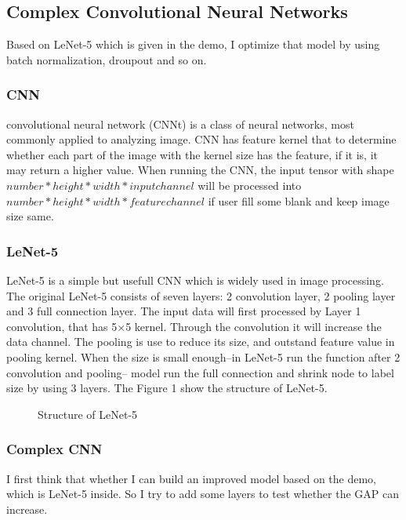 \documentclass{article}
\begin{document}
\subsection{Complex Convolutional Neural Networks}
Based on LeNet-5 which is given in the demo, I optimize that model by using batch normalization, droupout and so on. 
\subsubsection{CNN}
convolutional neural network (CNNt) is a class of neural networks, most commonly applied to analyzing image. CNN has feature kernel that to determine whether each part of the image with the kernel size has the feature, if it is, it may return a higher value. When running the CNN, the input tensor with shape $number*height*width*input channel$ will be processed into $number*height*width*feature channel$ if user fill some blank and keep image size same.

\subsubsection{LeNet-5}
LeNet-5 is a simple but usefull CNN which is widely used in image processing. The original LeNet-5 consists of seven layers: 2 convolution layer, 2 pooling layer and 3 full connection layer. The input data will first processed by Layer 1 convolution, that has 5$\times$5 kernel. Through the convolution it will increase the data channel. The pooling is use to reduce its size, and outstand feature value in pooling kernel. When the size is small enough--in LeNet-5 run the function after 2 convolution and pooling-- model run the full connection and shrink node to label size by using 3 layers. The Figure 1 show the structure of LeNet-5.
\begin{figure}[h]
  \centering
  \caption{Structure of LeNet-5}
\end{figure} 

\subsubsection{Complex CNN}
I first think that whether I can build an improved model based on the demo, which is LeNet-5 inside. So I try to add some layers to test whether the GAP can increase.
\end{document}
